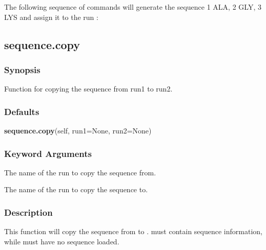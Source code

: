  The following sequence of commands will generate the sequence 1 ALA, 2 GLY, 3 LYS and assign it to the run : 
  





  

 \newpage 

 \subsection{sequence.copy} 

  
 \subsubsection{Synopsis} 

 Function for copying the sequence from run1 to run2. 
  

  
 \subsubsection{Defaults} 

 \textsf{\textbf{sequence.copy}(self, run1=None, run2=None)} 

  
 \subsubsection{Keyword Arguments} 

   The name of the run to copy the sequence from.   

   The name of the run to copy the sequence to.  

  

  
 \subsubsection{Description} 

 This function will copy the sequence from  to .   must contain sequence information, while  must have no sequence loaded. 
  

